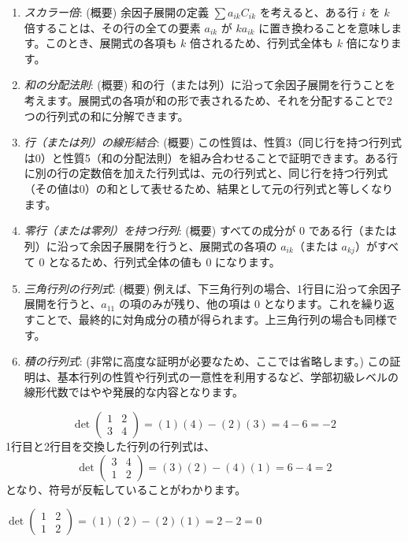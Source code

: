 \begin{thm}[行列式の性質]
\begin{proof*}
\begin{enumerate}
    \item \emph{スカラー倍}: (概要)
    余因子展開の定義 $\sum a_{ik}C_{ik}$ を考えると、ある行 $i$ を $k$ 倍することは、その行の全ての要素 $a_{ik}$ が $k a_{ik}$ に置き換わることを意味します。このとき、展開式の各項も $k$ 倍されるため、行列式全体も $k$ 倍になります。
    \item \emph{和の分配法則}: (概要)
    和の行（または列）に沿って余因子展開を行うことを考えます。展開式の各項が和の形で表されるため、それを分配することで2つの行列式の和に分解できます。
    \item \emph{行（または列）の線形結合}: (概要)
    この性質は、性質3（同じ行を持つ行列式は0）と性質5（和の分配法則）を組み合わせることで証明できます。ある行に別の行の定数倍を加えた行列式は、元の行列式と、同じ行を持つ行列式（その値は0）の和として表せるため、結果として元の行列式と等しくなります。
    \item \emph{零行（または零列）を持つ行列}: (概要)
    すべての成分が $0$ である行（または列）に沿って余因子展開を行うと、展開式の各項の $a_{ik}$（または $a_{kj}$）がすべて $0$ となるため、行列式全体の値も $0$ になります。
    \item \emph{三角行列の行列式}: (概要)
    例えば、下三角行列の場合、1行目に沿って余因子展開を行うと、$a_{11}$ の項のみが残り、他の項は $0$ となります。これを繰り返すことで、最終的に対角成分の積が得られます。上三角行列の場合も同様です。
    \item \emph{積の行列式}: (非常に高度な証明が必要なため、ここでは省略します。)
    この証明は、基本行列の性質や行列式の一意性を利用するなど、学部初級レベルの線形代数ではやや発展的な内容となります。
\end{enumerate}
\end{proof*}
\end{thm}

\begin{ex}
    \[\det\begin{pmatrix} 1 & 2 \\ 3 & 4 \end{pmatrix} = (1)(4)-(2)(3) = 4-6=-2\]
    1行目と2行目を交換した行列の行列式は、
    \[\det\begin{pmatrix} 3 & 4 \\ 1 & 2 \end{pmatrix} = (3)(2)-(4)(1) = 6-4=2\]
    となり、符号が反転していることがわかります。
\end{ex}

\begin{ex}
    $\det\begin{pmatrix} 1 & 2 \\ 1 & 2 \end{pmatrix} = (1)(2)-(2)(1) = 2-2=0$
\end{ex}

